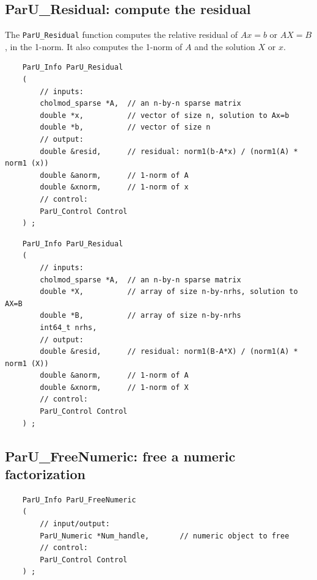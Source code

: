 \documentclass[12pt]{article}
\begin{document}
\subsection{{\sf ParU\_Residual}: compute the residual}

    The \verb'ParU_Residual' function computes the relative residual of
    $Ax=b$ or $AX=B$, in the 1-norm.  It also computes the 1-norm of $A$
    and the solution $X$ or $x$.

    {\footnotesize
    \begin{verbatim}
    ParU_Info ParU_Residual
    (
        // inputs:
        cholmod_sparse *A,  // an n-by-n sparse matrix
        double *x,          // vector of size n, solution to Ax=b
        double *b,          // vector of size n
        // output:
        double &resid,      // residual: norm1(b-A*x) / (norm1(A) * norm1 (x))
        double &anorm,      // 1-norm of A
        double &xnorm,      // 1-norm of x
        // control:
        ParU_Control Control
    ) ; \end{verbatim} }

    {\footnotesize
    \begin{verbatim}
    ParU_Info ParU_Residual
    (
        // inputs:
        cholmod_sparse *A,  // an n-by-n sparse matrix
        double *X,          // array of size n-by-nrhs, solution to AX=B
        double *B,          // array of size n-by-nrhs
        int64_t nrhs,
        // output:
        double &resid,      // residual: norm1(B-A*X) / (norm1(A) * norm1 (X))
        double &anorm,      // 1-norm of A
        double &xnorm,      // 1-norm of X
        // control:
        ParU_Control Control
    ) ; \end{verbatim} }

\subsection{{\sf ParU\_FreeNumeric}: free a numeric factorization}

    {\footnotesize
    \begin{verbatim}
    ParU_Info ParU_FreeNumeric
    (
        // input/output:
        ParU_Numeric *Num_handle,       // numeric object to free
        // control:
        ParU_Control Control
    ) ; \end{verbatim} }
\end{document}
